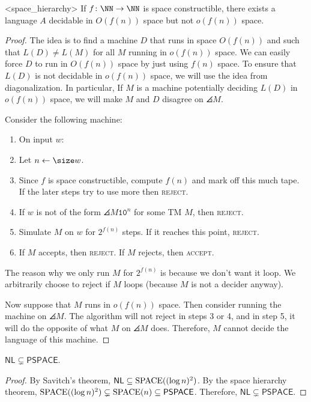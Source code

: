\documentclass{scrartcl}
\begin{document}
\begin{theorem}<space_hierarchy>
  If \(f \colon \NN \to \NN\) is space constructible, there exists a language \(A\) decidable in \(O(f(n))\) space but not \(o(f(n))\) space.
\end{theorem}
\begin{proof}
  The idea is to find a machine \(D\) that runs in space \(O(f(n))\) and such that \(L(D) \neq L(M)\) for all \(M\) running in \(o(f(n))\) space. We can easily force \(D\) to run in \(O(f(n))\) space by just using \(f(n)\) space. To ensure that \(L(D)\) is not decidable in \(o(f(n))\) space, we will use the idea from diagonalization. In particular, If \(M\) is a machine potentially deciding \(L(D)\) in \(o(f(n))\) space, we will make \(M\) and \(D\) disagree on \(\angles M\).
  
  Consider the following machine:
  \begin{enumerate}[start=0]
    \item On input \(w\):
    \item Let \(n \gets \size w\).
    \item Since \(f\) is space constructible, compute \(f(n)\) and mark off this much tape. If the later steps try to use more then \textsc{reject}.
    \item If \(w\) is not of the form \(\angles M \mathtt 1 \mathtt 0^n\) for some \textsf{TM} \(M\), then \textsc{reject}.
    \item Simulate \(M\) on \(w\) for \(2^{f(n)}\) steps. If it reaches this point, \textsc{reject}.
    \item If \(M\) accepts, then \textsc{reject}. If \(M\) rejects, then \textsc{accept}.
  \end{enumerate}

  The reason why we only run \(M\) for \(2^{f(n)}\) is because we don't want it loop. We arbitrarily choose to reject if \(M\) loops (because \(M\) is not a decider anyway).

  Now suppose that \(M\) runs in \(o(f(n))\) space. Then consider running the machine on \(\angles M\). The algorithm will not reject in steps 3 or 4, and in step 5, it will do the opposite of what \(M\) on \(\angles M\) does. Therefore, \(M\) cannot decide the language of this machine.
\end{proof}

\begin{corollary}
  \(\mathsf{NL} \subsetneq \mathsf{PSPACE}\).
\end{corollary}
\begin{proof}
  By Savitch's theorem, \(\mathsf{NL} \subseteq \operatorname{SPACE}((\log n)^2)\). By the space hierarchy theorem, \(\operatorname{SPACE}((\log n)^2) \subsetneq \operatorname{SPACE}(n) \subseteq \mathsf{PSPACE}\). Therefore, \(\mathsf{NL} \subsetneq \mathsf{PSPACE}\).
\end{proof}
\end{document}

